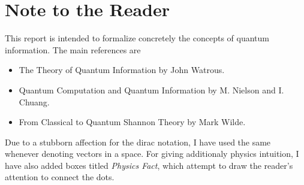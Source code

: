 \section*{Note to the Reader}
This report is intended to formalize concretely the concepts of quantum information. The main references are
\begin{itemize}
    \item The Theory of Quantum Information by John Watrous.
    \item Quantum Computation and Quantum Information by M. Nielson and I. Chuang.
    \item From Classical to Quantum Shannon Theory by Mark Wilde.
\end{itemize}
Due to a stubborn affection for the dirac notation, I have used the same whenever denoting vectors in a space. For giving additionaly physics intuition, I have also added boxes titled \textit{Physics Fact}, which attempt to draw the reader's attention to connect the dots.

\newpage